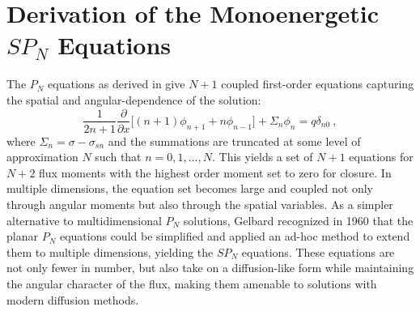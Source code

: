 \section{Derivation of the Monoenergetic $SP_N$ Equations}
\label{sec:spn_equations}
The $P_N$ equations as derived in \cite{lewis_computational_1993}
give $N+1$ coupled first-order equations capturing the spatial and
angular-dependence of the solution:
\begin{equation}
   \frac{1}{2n+1} \frac{\partial}{\partial x}\Big[ (n+1) \phi_{n+1} + n
     \phi_{n-1} \Big] + \Sigma_n \phi_n = q\delta_{n0} \:,
  \label{eq:final_pn_equations}
\end{equation}
where $\Sigma_n = \sigma-\sigma_{sn}$ and the summations are truncated
at some level of approximation $N$ such that $n = 0,1,\dotsc,N$. This
yields a set of $N+1$ equations for $N+2$ flux moments with the
highest order moment set to zero for closure. In multiple dimensions,
the equation set becomes large and coupled not only through angular
moments but also through the spatial variables. As a simpler
alternative to multidimensional $P_N$ solutions, Gelbard recognized in
1960 that the planar $P_N$ equations could be simplified and applied
an ad-hoc method to extend them to multiple dimensions, yielding the
$SP_N$ equations. These equations are not only fewer in number, but
also take on a diffusion-like form while maintaining the angular
character of the flux, making them amenable to solutions with modern
diffusion methods.

